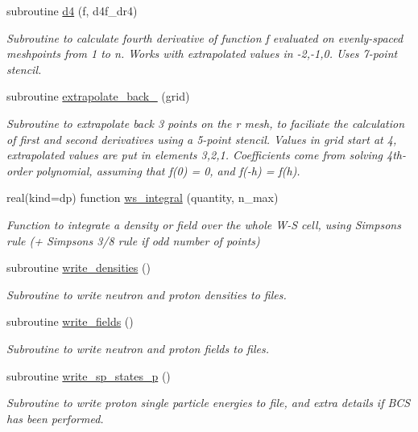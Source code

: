 \begin{DoxyCompactItemize}
subroutine \mbox{\hyperlink{namespaceroutines_a6d38e9b19f2e939feb7840d2575fbb56}{d4}} (f, d4f\+\_\+dr4)
\begin{DoxyCompactList}\small\item\em Subroutine to calculate fourth derivative of function f evaluated on evenly-\/spaced meshpoints from 1 to n. Works with extrapolated values in -\/2,-\/1,0. Uses 7-\/point stencil. \end{DoxyCompactList}\item 
subroutine \mbox{\hyperlink{namespaceroutines_af143340288720f8019e944ec7110a84e}{extrapolate\+\_\+back\+\_}} (grid)
\begin{DoxyCompactList}\small\item\em Subroutine to extrapolate back 3 points on the r mesh, to faciliate the calculation of first and second derivatives using a 5-\/point stencil. Values in grid start at 4, extrapolated values are put in elements 3,2,1. Coefficients come from solving 4th-\/order polynomial, assuming that f\textquotesingle{}(0) = 0, and f(-\/h) = f(h). \end{DoxyCompactList}\item 
real(kind=dp) function \mbox{\hyperlink{namespaceroutines_a5737b4327dcaa959a9ee519e4fca42e8}{ws\+\_\+integral}} (quantity, n\+\_\+max)
\begin{DoxyCompactList}\small\item\em Function to integrate a density or field over the whole W-\/S cell, using Simpson\textquotesingle{}s rule (+ Simpson\textquotesingle{}s 3/8 rule if odd number of points) \end{DoxyCompactList}\item 
subroutine \mbox{\hyperlink{namespaceroutines_a81e61269fb96b5478fd7140a1f185ec1}{write\+\_\+densities}} ()
\begin{DoxyCompactList}\small\item\em Subroutine to write neutron and proton densities to files. \end{DoxyCompactList}\item 
subroutine \mbox{\hyperlink{namespaceroutines_a4a59953c814b7fa48f2c4bf31d1763a2}{write\+\_\+fields}} ()
\begin{DoxyCompactList}\small\item\em Subroutine to write neutron and proton fields to files. \end{DoxyCompactList}\item 
subroutine \mbox{\hyperlink{namespaceroutines_ad51ac6c5da6056a5346d7b15b3fbe7b4}{write\+\_\+sp\+\_\+states\+\_\+p}} ()
\begin{DoxyCompactList}\small\item\em Subroutine to write proton single particle energies to file, and extra details if B\+CS has been performed. \end{DoxyCompactList}\end{DoxyCompactItemize}
